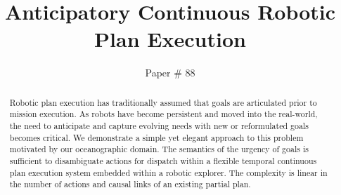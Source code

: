 \documentclass[letterpaper]{article}
\begin{document}
\title{Anticipatory Continuous Robotic Plan Execution}
\author{Paper \# 88}
\maketitle{}

\begin{abstract}

  Robotic plan execution has traditionally assumed that goals are
  articulated prior to mission execution. As robots have become
  persistent and moved into the real-world, the need to anticipate and
  capture evolving needs with new or reformulated goals becomes
  critical. We demonstrate a simple yet elegant approach to this
  problem motivated by our oceanographic domain.  The semantics of
  the urgency of goals is sufficient to disambiguate actions for dispatch
  within a flexible temporal continuous plan execution system embedded
  within a robotic explorer.  The complexity is linear in the number
  of actions and causal links of an existing partial plan.

\end{abstract}






 






\twocolumn 


\end{document}
